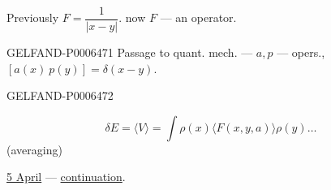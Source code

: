 Previously \(F=\dfrac1{|x-y|}\).
now \(F\) --- an operator.


\begin{GelfandAdjacentEvidence}{GELFAND-P000647}{1}
Passage to quant. mech. --- \(a,p\) --- opers.,
\(\left[a(x)\ p(y)\right]=\delta(x-y)\).
\end{GelfandAdjacentEvidence}
\begin{GelfandAdjacentEvidence}{GELFAND-P000647}{2}


\[
\delta E=\langle V\rangle=\int\rho(x)\langle F(x,y,a)\rangle\rho(y)\ldots
\]
(averaging)
\end{GelfandAdjacentEvidence}


\underline{5 April} --- \underline{continuation}.


